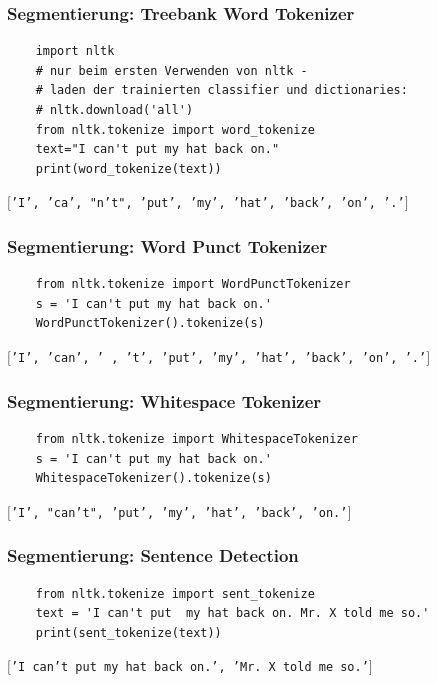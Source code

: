 \begin{frame}[fragile]
    \frametitle{Segmentierung: Treebank Word Tokenizer}
    
    \begin{verbatim}
    import nltk
    # nur beim ersten Verwenden von nltk -
    # laden der trainierten classifier und dictionaries: 
    # nltk.download('all') 
    from nltk.tokenize import word_tokenize
    text="I can't put my hat back on."
    print(word_tokenize(text))
    \end{verbatim}

    \texttt{$[$'I', 'ca', "n't", 'put', 'my', 'hat', 'back', 'on', '.'$]$}
\end{frame}
    
    
\begin{frame}[fragile]
    \frametitle{Segmentierung: Word Punct Tokenizer}
    
    \begin{verbatim}
    from nltk.tokenize import WordPunctTokenizer 
    s = 'I can't put my hat back on.' 
    WordPunctTokenizer().tokenize(s)
    \end{verbatim}

    \texttt{$[$'I', 'can', \dq ' \dq, 't', 'put', 'my', 'hat', 'back', 'on', '.'$]$}
\end{frame}
    
    
\begin{frame}[fragile]
    \frametitle{Segmentierung: Whitespace Tokenizer}
   
   \begin{verbatim}
    from nltk.tokenize import WhitespaceTokenizer
    s = 'I can't put my hat back on.'
    WhitespaceTokenizer().tokenize(s)
    \end{verbatim}

    \texttt{$[$'I', "can't", 'put', 'my', 'hat', 'back', 'on.'$]$}
\end{frame}
 
    
\begin{frame}[fragile]
    \frametitle{Segmentierung: Sentence Detection}
    
    \begin{verbatim}
    from nltk.tokenize import sent_tokenize
    text = 'I can't put  my hat back on. Mr. X told me so.'
    print(sent_tokenize(text))
    \end{verbatim}

    \texttt{$[$'I can't put  my hat back on.', 'Mr. X told me so.'$]$}
\end{frame}
    
